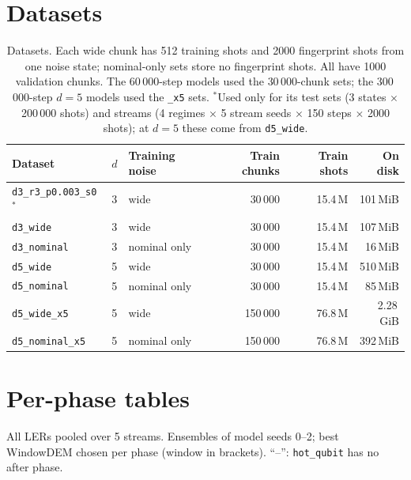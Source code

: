 \documentclass[11pt,a4paper]{article}
\newcommand{\code}[1]{\texttt{#1}}
\newcommand{\reg}[1]{\texttt{#1}}
\begin{document}
\section{Datasets}\label{app:data}

\begin{table}[htbp]
\centering
\small
\begin{tabular}{@{}lllrrr@{}}
\toprule
Dataset & $d$ & Training noise & Train chunks & Train shots & On disk \\
\midrule
\code{d3\_r3\_p0.003\_s0}$^{*}$ & 3 & wide & 30\,000 & 15.4\,M & 101\,MiB \\
\code{d3\_wide} & 3 & wide & 30\,000 & 15.4\,M & 107\,MiB \\
\code{d3\_nominal} & 3 & nominal only & 30\,000 & 15.4\,M & 16\,MiB \\
\code{d5\_wide} & 5 & wide & 30\,000 & 15.4\,M & 510\,MiB \\
\code{d5\_nominal} & 5 & nominal only & 30\,000 & 15.4\,M & 85\,MiB \\
\code{d5\_wide\_x5} & 5 & wide & 150\,000 & 76.8\,M & 2.28\,GiB \\
\code{d5\_nominal\_x5} & 5 & nominal only & 150\,000 & 76.8\,M & 392\,MiB \\
\bottomrule
\end{tabular}
\caption{Datasets. Each wide chunk has 512 training shots and 2000 fingerprint shots from one noise state;
nominal-only sets store no fingerprint shots. All have 1000 validation chunks. The 60\,000-step models used the
$30\,000$-chunk sets; the 300\,000-step $d=5$ models used the \code{\_x5} sets. $^{*}$Used only for its test sets
(3 states $\times$ 200\,000 shots) and streams (4 regimes $\times$ 5 stream seeds $\times$ 150 steps $\times$ 2000
shots); at $d=5$ these come from \code{d5\_wide}.}
\label{tab:datasets}
\end{table}

\section{Per-phase tables}\label{app:tables}

All LERs pooled over 5 streams. Ensembles of model seeds 0--2; best WindowDEM chosen per phase (window in brackets).
``--'': \reg{hot\_qubit} has no after phase.
\end{document}

